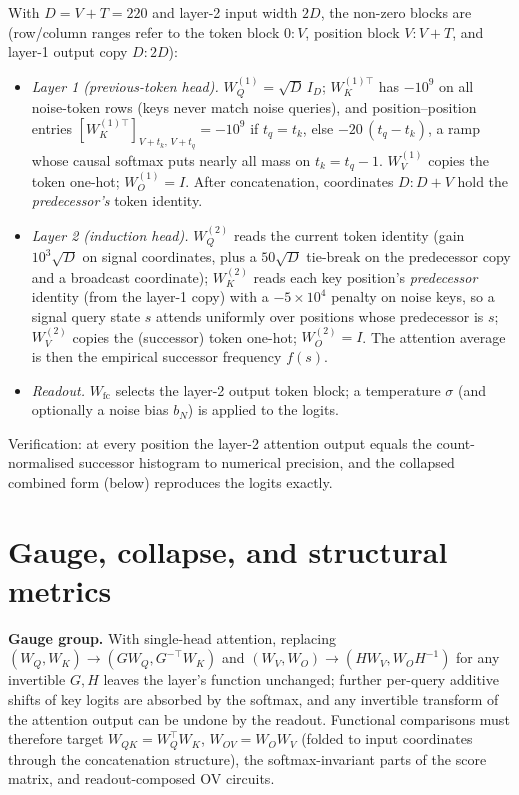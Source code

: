 \documentclass{article} %
\newcommand{\WQK}{W_{QK}}
\newcommand{\WOV}{W_{OV}}
\begin{document}
With $D=V+T=220$ and layer-2 input width $2D$, the non-zero blocks are (row/column
ranges refer to the token block $0{:}V$, position block $V{:}V{+}T$, and layer-1
output copy $D{:}2D$):
\begin{itemize}
\item \emph{Layer 1 (previous-token head).} $W_Q^{(1)}=\sqrt{D}\,I_D$;
$W_K^{(1)\top}$ has $-10^{9}$ on all noise-token rows (keys never match noise
queries), and position--position entries $[W_K^{(1)\top}]_{V+t_k,\,V+t_q}
= -10^{9}$ if $t_q=t_k$, else $-20\,(t_q-t_k)$, a ramp whose causal softmax puts
nearly all mass on $t_k=t_q-1$. $W_V^{(1)}$ copies the token one-hot;
$W_O^{(1)}=I$. After concatenation, coordinates $D{:}D{+}V$ hold the
\emph{predecessor's} token identity.
\item \emph{Layer 2 (induction head).} $W_Q^{(2)}$ reads the current token identity
(gain $10^{3}\sqrt{D}$ on signal coordinates, plus a $50\sqrt{D}$ tie-break on the
predecessor copy and a broadcast coordinate); $W_K^{(2)}$ reads each key position's
\emph{predecessor} identity (from the layer-1 copy) with a $-5\times10^{4}$ penalty
on noise keys, so a signal query state $s$ attends uniformly over positions whose
predecessor is $s$; $W_V^{(2)}$ copies the (successor) token one-hot; $W_O^{(2)}=I$.
The attention average is then the empirical successor frequency $f(s)$.
\item \emph{Readout.} $W_{\mathrm{fc}}$ selects the layer-2 output token block; a
temperature $\sigma$ (and optionally a noise bias $b_N$) is applied to the logits.
\end{itemize}
Verification: at every position the layer-2 attention output equals the
count-normalised successor histogram to numerical precision, and the collapsed
combined form (below) reproduces the logits exactly.

\section{Gauge, collapse, and structural metrics}
\label{app:gauge}

\textbf{Gauge group.} With single-head attention, replacing
$(W_Q,W_K)\to(GW_Q,G^{-\top}W_K)$ and $(W_V,W_O)\to(HW_V,W_OH^{-1})$ for any
invertible $G,H$ leaves the layer's function unchanged; further per-query additive
shifts of key logits are absorbed by the softmax, and any invertible transform of
the attention output can be undone by the readout. Functional comparisons must
therefore target $\WQK=W_Q^{\top}W_K$, $\WOV=W_OW_V$ (folded to input coordinates
through the concatenation structure), the softmax-invariant parts of the score
matrix, and readout-composed OV circuits.
\end{document}
